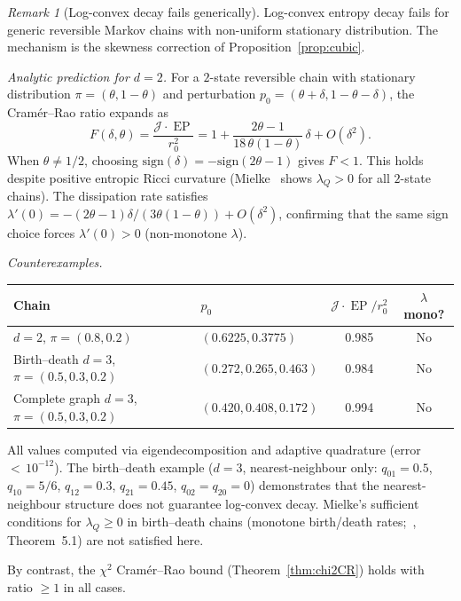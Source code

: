 \documentclass[11pt,a4paper]{article}
\theoremstyle{definition}
\theoremstyle{remark}
\newtheorem{remark}[theorem]{Remark}
\DeclareMathOperator{\EP}{EP}
\begin{document}
\begin{remark}[Log-convex decay fails
generically]\label{rem:LCD-fails}
Log-convex entropy decay fails for generic reversible Markov
chains with non-uniform stationary distribution.
The mechanism is the skewness correction of
Proposition~\ref{prop:cubic}.

\emph{Analytic prediction for $d = 2$.}
For a $2$-state reversible chain with stationary distribution
$\pi = (\theta, 1-\theta)$ and perturbation
$p_0 = (\theta + \delta, 1-\theta-\delta)$,
the Cram\'er--Rao ratio expands as
\begin{equation}\label{eq:F-d2}
  F(\delta,\theta)
  = \frac{\mathcal{J}\cdot\EP}{r_0^2}
  = 1 + \frac{2\theta-1}{18\,\theta(1-\theta)}\,\delta
  + O(\delta^2).
\end{equation}
When $\theta \ne 1/2$, choosing
$\mathrm{sign}(\delta) = -\mathrm{sign}(2\theta-1)$ gives
$F < 1$.  This holds despite positive entropic Ricci curvature
(Mielke~\cite{Mielke2013} shows $\lambda_Q > 0$ for all
$2$-state chains).
The dissipation rate satisfies
$\lambda'(0) = -(2\theta-1)\delta/(3\theta(1-\theta)) + O(\delta^2)$,
confirming that the same sign choice forces $\lambda'(0) > 0$
(non-monotone $\lambda$).

\emph{Counterexamples.}
\begin{center}
\begin{tabular}{@{}llcc@{}}
\toprule
Chain & $p_0$ &
$\mathcal{J}\cdot\EP/r_0^2$ & $\lambda$ mono? \\
\midrule
$d = 2$, $\pi = (0.8, 0.2)$
& $(0.6225, 0.3775)$
& 0.985 & No \\[2pt]
Birth--death $d = 3$,
$\pi = (0.5, 0.3, 0.2)$
& $(0.272, 0.265, 0.463)$
& 0.984 & No \\[2pt]
Complete graph $d = 3$,
$\pi = (0.5, 0.3, 0.2)$
& $(0.420, 0.408, 0.172)$
& 0.994 & No \\
\bottomrule
\end{tabular}
\end{center}
All values computed via eigendecomposition and adaptive quadrature
(error~${<}\,10^{-12}$).
The birth--death example ($d = 3$, nearest-neighbour only:
$q_{01} = 0.5$, $q_{10} = 5/6$, $q_{12} = 0.3$,
$q_{21} = 0.45$, $q_{02} = q_{20} = 0$) demonstrates that the
nearest-neighbour structure does not guarantee log-convex decay.
Mielke's sufficient conditions for $\lambda_Q \ge 0$ in
birth--death chains (monotone birth/death
rates;~\cite{Mielke2013}, Theorem~5.1) are not satisfied here.

By contrast, the $\chi^2$ Cram\'er--Rao bound
(Theorem~\ref{thm:chi2CR}) holds with ratio $\ge 1$ in all cases.
\end{remark}
\end{document}
